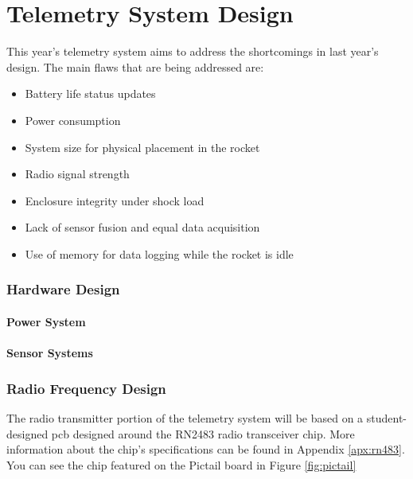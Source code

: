 \part{Telemetry System Design}

This year's telemetry system aims to address the shortcomings in last year's design. The main flaws that are being
addressed are:

\begin{itemize}
    \item Battery life status updates
    \item Power consumption
    \item System size for physical placement in the rocket
    \item Radio signal strength
    \item Enclosure integrity under shock load
    \item Lack of sensor fusion and equal data acquisition
    \item Use of memory for data logging while the rocket is idle
\end{itemize}

\section{Hardware Design}

\subsection{Power System}


\subsection{Sensor Systems}


\section{Radio Frequency Design}

The radio transmitter portion of the telemetry system will be based on a student-designed \gls{pcb} designed around the
RN2483 radio transceiver chip. More information about the chip's specifications can be found in Appendix
\ref{apx:rn483}. You can see the chip featured on the Pictail board in Figure \ref{fig:pictail}

